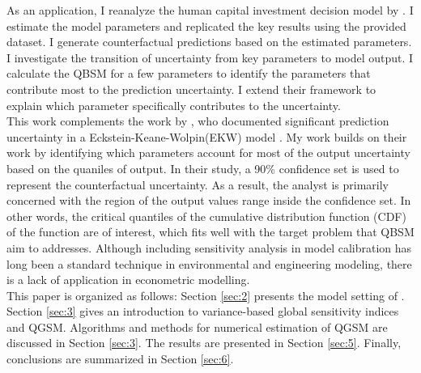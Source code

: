 \noindent
As an application, I reanalyze the human capital investment decision model by \cite{keane1994SolutionEstimationDiscrete}. I estimate the model parameters and replicated the key results using the provided dataset. I generate counterfactual predictions based on the estimated parameters.  I investigate the transition of uncertainty from key parameters to model output. I calculate the QBSM for a few parameters to identify the parameters that contribute most to the prediction uncertainty.  I extend their framework to explain which parameter specifically contributes to the uncertainty. \\

\noindent
This work complements the work by \cite{eisenhauer2021StructuralModelsPolicymaking}, who documented significant prediction uncertainty in a Eckstein-Keane-Wolpin(EKW) model \citep{aguirregabiria2010DynamicDiscreteChoice}. My work builds on their work by identifying which parameters account for most of the output uncertainty based on the quaniles of output. In their study, a 90\% confidence set is used to represent the counterfactual uncertainty. As a result, the analyst is primarily concerned with the region of the output values range inside the confidence set. In other words, the critical quantiles of the cumulative distribution function (CDF) of the function are of interest, which fits well with the target problem that QBSM aim to addresses. Although including sensitivity analysis in model calibration has long been a standard technique in environmental and engineering modeling, there is a lack of application in econometric modelling.\\


\noindent
This paper is organized as follows: Section \ref{sec:2} presents the model setting of \cite{keane1994SolutionEstimationDiscrete}. Section \ref{sec:3} gives an introduction to variance-based global sensitivity indices and QGSM. Algorithms and methods for numerical estimation of QGSM are discussed in Section \ref{sec:3}. The results are presented in Section \ref{sec:5}.  Finally, conclusions are summarized in Section \ref{sec:6}.\\